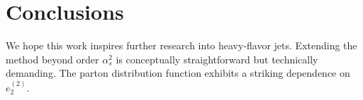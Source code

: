 \section{Conclusions}\label{sec:conclusions}

We hope this work inspires further research into heavy-flavor jets.
Extending the method beyond order $\alpha_s^2$ is conceptually
straightforward but technically demanding. The parton distribution
function exhibits a striking dependence on $e_2^{(2)}$.

